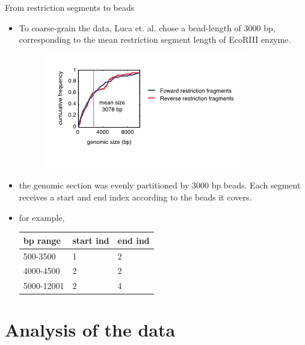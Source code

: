\documentclass[8pt]{beamer}
\begin{document}
\begin{frame}{From restriction segments to beads}
\begin{itemize}
\item To coarse-grain the data, Luca et. al. chose a bead-length of 3000 bp, corresponding to the mean restriction segment length of EcoRIII enzyme. 
\begin{figure}[H]
\includegraphics[scale=0.45]{restrictionSegmentLengthDistributionLucaetal}
\end{figure}
\item the genomic section was evenly partitioned by 3000 bp beads. Each segment receives a start and end index according to the beads it covers. 
\item for example, 
\begin{tabular}[H]{|l| l| l|}
\hline
bp range & start ind & end ind\\
\hline
500-3500   & 1         & 2 \\
4000-4500  & 2         & 2 \\   
5000-12001 & 2         & 4 \\       
\hline  
\end{tabular}
\end{itemize}
\end{frame}

\section{Analysis of the data}
\end{document}
